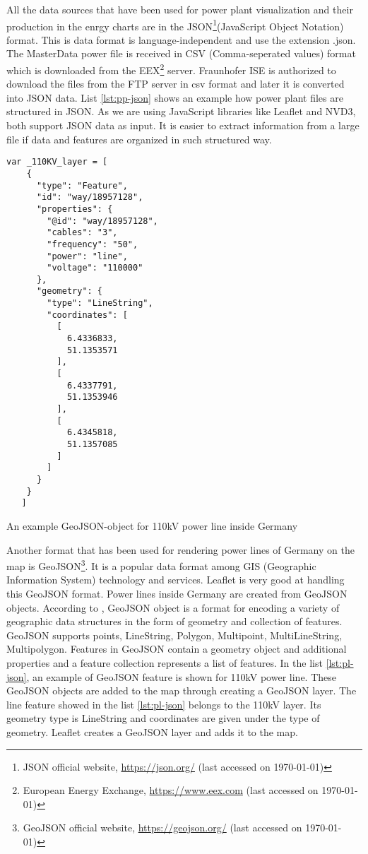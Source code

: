All the data sources that have been used for power plant visualization and their production in the enrgy charts are in the JSON\footnote{JSON official website, \url{https://json.org/} (last accessed on {\today})}(JavaScript Object Notation) format. This is data format is language-independent and use the extension .json. The MasterData power file is received in CSV (Comma-seperated values) format which is downloaded from the EEX\footnote{European Energy Exchange, \url{https://www.eex.com} (last accessed on {\today})} server. Fraunhofer ISE is authorized to download the files from the FTP server in csv format and later it is converted into JSON data. List \ref{lst:pp-json} shows an example how power plant files are structured in JSON. As we are using JavaScript libraries like Leaflet and NVD3, both support JSON data as input. It is easier to extract information from a large file if data and features are organized in such structured way. 

\begin{Listing}[H]
\begin{lstlisting}
var _110KV_layer = [
    {
      "type": "Feature",
      "id": "way/18957128",
      "properties": {
        "@id": "way/18957128",
        "cables": "3",
        "frequency": "50",
        "power": "line",
        "voltage": "110000"
      },
      "geometry": {
        "type": "LineString",
        "coordinates": [
          [
            6.4336833,
            51.1353571
          ],
          [
            6.4337791,
            51.1353946
          ],
          [
            6.4345818,
            51.1357085
          ]
        ]
      }
    }
   ]
\end{lstlisting}
\caption{An example GeoJSON-object for 110kV power line inside Germany}
\label{lst:pl-json}
\end{Listing}

Another format that has been used for rendering power lines of Germany on the map is GeoJSON\footnote{GeoJSON official website, \url{https://geojson.org/} (last accessed on {\today})}. It is a popular data format among GIS (Geographic Information System) technology and services. Leaflet is very good at handling this GeoJSON format. Power lines inside Germany are created from GeoJSON objects. According to \cite{geojson16}, GeoJSON object is a format for encoding a variety of geographic data structures in the form of geometry and collection of features. GeoJSON supports points, LineString, Polygon, Multipoint, MultiLineString, Multipolygon. Features in GeoJSON contain a geometry object and additional properties and a feature collection represents a list of features. In the list \ref{lst:pl-json}, an example of GeoJSON feature is shown for 110kV power line. These GeoJSON objects are added to the map through creating a GeoJSON layer. The line feature showed in the list \ref{lst:pl-json} belongs to the 110kV layer. Its geometry type is LineString and coordinates are given under the type of geometry. Leaflet creates a GeoJSON layer and adds it to the map.


